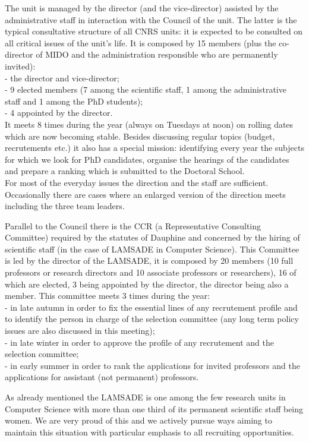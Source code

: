 The unit is managed by the director (and the vice-director) assisted by the administrative staff in interaction with the Council of the unit. The latter is the typical consultative structure of all CNRS units: it is expected to be consulted on all critical issues of the unit's life. It is composed by 15 members (plus the co-director of MIDO and the administration responsible who are permanently invited): \\
 - the director and vice-director; \\
 - 9 elected members (7 among the scientific staff, 1 among the administrative staff and 1 among the PhD students); \\
 - 4 appointed by the director. \\
It meets 8 times during the year (always on Tuesdays at noon) on rolling dates which are now becoming stable. Besides discussing regular topics (budget, recrutements etc.) it also has a special mission: identifying every year the subjects for which we look for PhD candidates, organise the hearings of the candidates and prepare a ranking which is submitted to the Doctoral School. \\
For most of the everyday issues the direction and the staff are sufficient. Occasionally there are cases where an enlarged version of the direction meets including the three team leaders.

Parallel to the Council there is the CCR (a Representative Consulting Committee) required by the statutes of Dauphine and concerned by the hiring of scientific staff (in the case of LAMSADE in Computer Science). This Committee is led by the director of the LAMSADE, it is composed by 20 members (10 full professors or research directors and 10 associate professors or researchers), 16 of which are elected, 3 being appointed by the director, the director being also a member. This committee meets 3 times during the year: \\
 - in late autumn in order to fix the essential lines of any recrutement profile and to identify the person in charge of the selection committee (any long term policy issues are also discussed in this meeting); \\
 - in late winter in order to approve the profile of any recrutement and the selection committee; \\
 - in early summer in order to rank the applications for invited professors and the applications for assistant (not permanent) professors.

As already mentioned the LAMSADE is one among the few research units in Computer Science with more than one third of its permanent scientific staff being women. We are very proud of this and we actively pursue ways aiming to maintain this situation with particular emphasis to all recruiting opportunities.

